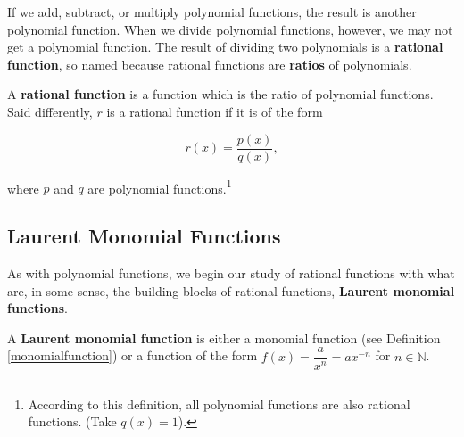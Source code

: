 \documentclass{ximera}
\begin{document}
	\author{Stitz-Zeager}



\setcounter{footnote}{0}

\label{IntroRational}


If we add, subtract, or multiply polynomial functions, the result is another polynomial function.  When we divide polynomial functions, however, we may not get a polynomial function.   The result of dividing two polynomials is a    \textbf{rational function}, so named because rational functions  are \textbf{ratios} of polynomials.

\smallskip

\colorbox{ResultColor}{\bbm

\begin{defn}  \label{rationalfunction} A \textbf{rational function} is a function which is the ratio of polynomial functions.  Said differently, $r$ is a rational function if it is of the form 

\[ r(x) = \dfrac{p(x)}{q(x)},\]

where $p$ and $q$ are polynomial functions.\footnote{According to this definition, all polynomial functions are also  rational functions. (Take $q(x) = 1$).}

\end{defn}

\ebm}

\subsection{Laurent Monomial Functions}
\label{LaurentMonomialFunctionsSection}

As with polynomial functions, we begin our study of rational functions with what are, in some sense, the building blocks of rational functions, \textbf{Laurent monomial functions}.  

\colorbox{ResultColor}{\bbm

\begin{defn}  \label{laurentmonomialfunction} A \textbf{Laurent monomial function} is either a monomial function (see Definition \ref{monomialfunction}) or a function of the form $f(x) = \dfrac{a}{x^n} = ax^{-n}$ for $n \in \mathbb{N}$.

\end{defn}

\ebm}
\end{document}
